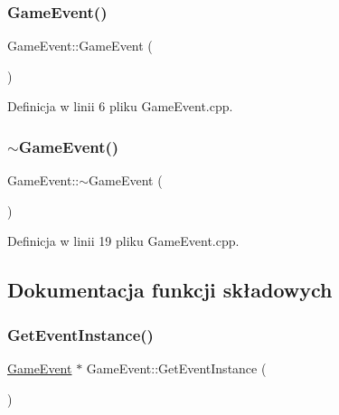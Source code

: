\subsubsection{\texorpdfstring{Game\+Event()}{GameEvent()}}
{\footnotesize\ttfamily Game\+Event\+::\+Game\+Event (\begin{DoxyParamCaption}{ }\end{DoxyParamCaption})}



Definicja w linii 6 pliku Game\+Event.\+cpp.

\mbox{\label{class_game_event_aaf514ed35c80bbbcc54ce411d9d71eef}} 
\subsubsection{\texorpdfstring{$\sim$\+Game\+Event()}{~GameEvent()}}
{\footnotesize\ttfamily Game\+Event\+::$\sim$\+Game\+Event (\begin{DoxyParamCaption}{ }\end{DoxyParamCaption})\hspace{0.3cm}{\ttfamily [virtual]}}



Definicja w linii 19 pliku Game\+Event.\+cpp.



\subsection{Dokumentacja funkcji składowych}
\mbox{\label{class_game_event_a683bf5025fe1a31263cb96059fc9e5a5}} 
\subsubsection{\texorpdfstring{Get\+Event\+Instance()}{GetEventInstance()}}
{\footnotesize\ttfamily \mbox{\hyperlink{class_game_event}{Game\+Event}} $\ast$ Game\+Event\+::\+Get\+Event\+Instance (\begin{DoxyParamCaption}{ }\end{DoxyParamCaption})\hspace{0.3cm}{\ttfamily [static]}}




